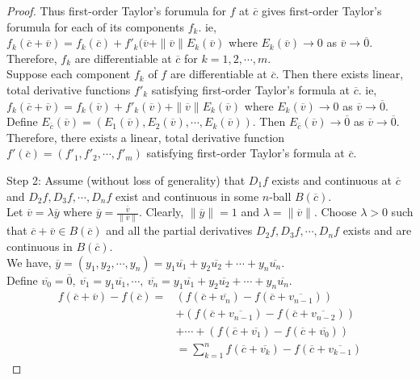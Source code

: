 \begin{proof}
	Thus first-order Taylor's forumula for $f$ at $\overline{c}$ gives first-order Taylor's forumula for each of its components $f_k$. ie, $f_k(\overline{c}+\overline{v}) = f_k(\overline{c}) + f'_k(\overline{v} + \|\overline{v}\|E_k(\overline{v})$ where $E_k(\overline{v}) \to 0$ as $\overline{v} \to \overline{0}$. Therefore, $f_k$ are differentiable at $\overline{c}$ for $k = 1,2,\cdots, m$.\\

	Suppose each component $f_k$ of $f$ are differentiable at $\overline{c}$. Then there exists linear, total derivative functions $f'_k$ satisfying first-order Taylor's formula at $\overline{c}$. ie, $f_k(\overline{c}+\overline{v}) = f_k(\overline{v}) + f'_k(\overline{v}) + \|\overline{v}\|E_k(\overline{v})$ where $E_k(\overline{v}) \to 0$ as $\overline{v} \to \overline{0}$.\\
	
	Define $E_{\overline{c}}(\overline{v}) = \left( E_1(\overline{v}), E_2(\overline{v}), \cdots, E_k(\overline{v}) \right)$. Then $E_{\overline{c}}(\overline{v}) \to \overline{0}$ as $\overline{v} \to \overline{0}$. Therefore, there exists a linear, total derivative function $f'(\overline{c}) = \left( f'_1, f'_2, \cdots, f'_m \right)$ satisfying first-order Taylor's formula at $\overline{c}$.\\

	\par{Step 2: } Assume (without loss of generality) that $D_1f$ exists and continuous at $\overline{c}$ and $D_2f,D_3f,\cdots,D_nf$ exist and continuous in some $n$-ball $B(\overline{c})$.\\

	Let $\overline{v} = \lambda\overline{y}$ where $\overline{y} = \frac{\overline{v}}{\|\overline{v}\|}$. Clearly, $\|\overline{y}\| = 1$ and $\lambda = \| \overline{v} \|$. Choose $\lambda > 0$ such that $\overline{c}+\overline{v} \in B(\overline{c})$ and all the partial derivatives $D_2f, D_3f, \cdots, D_nf$ exists and are continuous in $B(\overline{c})$.\\

	We have, $\overline{y} = (y_1, y_2, \cdots, y_n) = y_1 \overline{u_1} + y_2 \overline{u_2} + \cdots + y_n \overline{u_n}$.\\

	Define $\overline{v_0} = \overline{0},\ \overline{v_1} = y_1\overline{u_1}, \cdots, \ \overline{v_n} = y_1 \overline{u_1} + y_2 \overline{u_2} + \cdots + y_n \overline{u_n}$.
	\begin{align*}
		f(\overline{c}+\overline{v}) - f(\overline{c}) = & ( f(\overline{c}+\overline{v_n}) - f(\overline{c}+\overline{v_{n-1}}) ) \\
		& + ( f(\overline{c}+\overline{v_{n-1}}) - f(\overline{c}+\overline{v_{n-2}}) ) \\
		& + \cdots + ( f(\overline{c}+\overline{v_1}) - f(\overline{c}+\overline{v_0}) ) \\
		& = \sum_{k = 1}^n f(\overline{c} + \overline{v_k}) - f(\overline{c} + \overline{v_{k-1}})
	\end{align*}
\end{proof}
